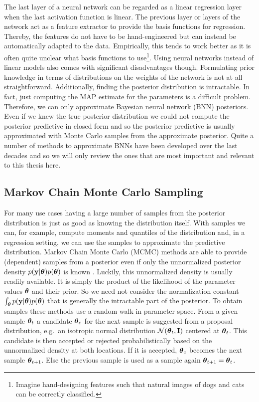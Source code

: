 \documentclass[../thesis.tex]{subfiles}
\begin{document}
The last layer of a neural network can be regarded as a linear regression layer when the last activation function is linear. The previous layer or layers of the network act as a feature extractor to provide the basis functions for regression. Thereby, the features do not have to be hand-engineered but can instead be automatically adapted to the data. Empirically, this tends to work better as it is often quite unclear what basis functions to use\footnote{Imagine hand-designing features such that natural images of dogs and cats can be correctly classified.}. Using neural networks instead of linear models also comes with significant disadvantages though. Formulating prior knowledge in terms of distributions on the weights of the network is not at all straightforward. Additionally, finding the posterior distribution is intractable. In fact, just computing the MAP estimate for the parameters is a difficult problem. Therefore, we can only approximate Bayesian neural network (BNN) posteriors. Even if we knew the true posterior distribution we could not compute the posterior predictive in closed form and so the posterior predictive is usually approximated with Monte Carlo samples from the approximate posterior. Quite a number of methods to approximate BNNs have been developed over the last decades and so we will only review the ones that are most important and relevant to this thesis here.

\subsection*{Markov Chain Monte Carlo Sampling}
For many use cases having a large number of samples from the posterior distribution is just as good as knowing the distribution itself. With samples we can, for example, compute moments and quantiles of the distribution and, in a regression setting, we can use the samples to approximate the predictive distribution. Markov Chain Monte Carlo (MCMC) methods are able to provide (dependent) samples from a posterior even if only the unnormalized posterior density $p(\boldsymbol{\mathbf{y}}|\boldsymbol{\mathbf{\theta}})p(\boldsymbol{\mathbf{\theta}})$ is known \parencite{andrieu2003introduction}. Luckily, this unnormalized density is usually readily available. It is simply the product of the likelihood of the parameter values $\boldsymbol{\mathbf{\theta}}$ and their prior. So we need not consider the normalization constant $\int_{\boldsymbol{\mathbf{\theta}}} p(\boldsymbol{\mathbf{y}}|\boldsymbol{\mathbf{\theta}})p(\boldsymbol{\mathbf{\theta}})$ that is generally the intractable part of the posterior. To obtain samples these methods use a random walk in parameter space. From a given sample $\boldsymbol{\mathbf{\theta}}_t$ a candidate $\boldsymbol{\mathbf{\theta}}_{c}$ for the next sample is suggested from a proposal distribution, e.g.\ an isotropic normal distribution $\mathcal{N}(\boldsymbol{\mathbf{\theta}}_t, \boldsymbol{\mathbf{I}})$ centered at $\boldsymbol{\mathbf{\theta}}_t$. This candidate is then accepted or rejected probabilistically based on the unnormalized density at both locations. If it is accepted, $\boldsymbol{\mathbf{\theta}}_c$ becomes the next sample $\boldsymbol{\mathbf{\theta}}_{t+1}$. Else the previous sample is used as a sample again $\boldsymbol{\mathbf{\theta}}_{t+1} = \boldsymbol{\mathbf{\theta}}_t$.
\end{document}
